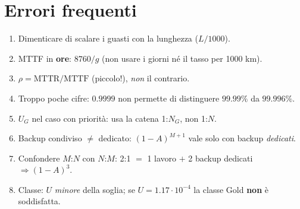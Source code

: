 \section{Errori frequenti}
\begin{attenzione}
\begin{enumerate}[leftmargin=*]
\item Dimenticare di scalare i guasti con la lunghezza ($L/1000$).
\item MTTF in \textbf{ore}: $8760/g$ (non usare i giorni né il tasso per 1000 km).
\item $\rho=\mathrm{MTTR}/\mathrm{MTTF}$ (piccolo!), \emph{non} il contrario.
\item Troppo poche cifre: $0.9999$ non permette di distinguere $99.99\%$ da $99.996\%$.
\item $U_G$ nel caso con priorità: usa la catena 1:$N_G$, non 1:$N$.
\item Backup condiviso $\ne$ dedicato: $(1-A)^{M+1}$ vale solo con backup \emph{dedicati}.
\item Confondere $M$:$N$ con $N$:$M$: \guillemotleft{}2:1\guillemotright{} $=$ 1 lavoro $+$ 2 backup dedicati $\Rightarrow(1-A)^3$.
\item Classe: $U$ \emph{minore} della soglia; se $U=1.17\cdot10^{-4}$ la classe Gold \textbf{non} è soddisfatta.
\end{enumerate}
\end{attenzione}
